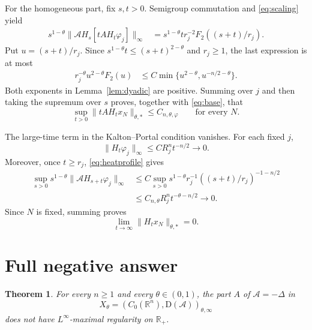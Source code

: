 \documentclass[11pt]{article}
\newtheorem{theorem}{Theorem}
\newcommand{\R}{\mathbb R}
\newcommand{\cA}{\mathcal A}
\newcommand{\D}{\mathrm D}
\begin{document}
For the homogeneous part, fix $s,t>0$.  Semigroup commutation and
\eqref{eq:scaling} yield
\begin{align*}
 s^{1-\theta}\|\cA H_s[tAH_t\varphi_j]\|_\infty
 &=s^{1-\theta}t r_j^{-2}
   F_2((s+t)/r_j).
\end{align*}
Put $u=(s+t)/r_j$.  Since
$s^{1-\theta}t\leq(s+t)^{2-\theta}$ and $r_j\geq1$, the last expression is
at most
\begin{align*}
 r_j^{-\theta}u^{2-\theta}F_2(u)
 &\leq C\min\{u^{2-\theta},u^{-n/2-\theta}\}.
\end{align*}
Both exponents in Lemma~\ref{lem:dyadic} are positive.  Summing over $j$ and
then taking the supremum over $s$ proves, together with \eqref{eq:base}, that
\begin{equation}\label{eq:uniform}
 \sup_{t>0}\|tAH_tx_N\|_{\theta,*}\leq C_{n,\theta,\varphi}
 \qquad\text{for every }N.
\end{equation}

The large-time term in the Kalton--Portal condition vanishes.  For each
fixed $j$,
\[
 \|H_t\varphi_j\|_\infty
 \leq C R_j^n t^{-n/2}\longrightarrow0.
\]
Moreover, once $t\geq r_j$, \eqref{eq:heatprofile} gives
\begin{align*}
 \sup_{s>0}s^{1-\theta}\|\cA H_{s+t}\varphi_j\|_\infty
 &\leq C\sup_{s>0}s^{1-\theta}r_j^{-1}
       ((s+t)/r_j)^{-1-n/2}\\
 &\leq C_{n,\theta}R_j^n t^{-\theta-n/2}
 \longrightarrow0.
\end{align*}
Since $N$ is fixed, summing proves
\begin{equation}\label{eq:vanish}
 \lim_{t\to\infty}\|H_tx_N\|_{\theta,*}=0.
\end{equation}

\section{Full negative answer}

\begin{theorem}\label{thm:main}
For every $n\geq1$ and every $\theta\in(0,1)$, the part $A$ of
$\cA=-\Delta$ in
\[
 X_\theta=(C_0(\R^n),\D(\cA))_{\theta,\infty}
\]
does not have $L^\infty$-maximal regularity on $\R_+$.
\end{theorem}
\end{document}

